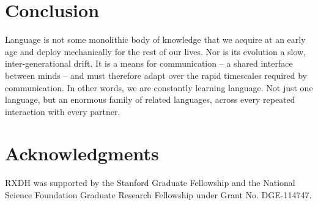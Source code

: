 \documentclass[11pt, floatsintext, jou]{apa6}
\begin{document}

\section{Conclusion}

Language is not some monolithic body of knowledge that we acquire at an early age and deploy mechanically for the rest of our lives. Nor is its evolution a slow, inter-generational drift. It is a means for communication -- a shared interface between minds -- and must therefore adapt over the rapid timescales required by communication. In other words, we are constantly learning language. Not just one language, but an enormous family of related languages, across every repeated interaction with every partner. 


\section{\bf Acknowledgments}
\small
\noindent RXDH was supported by the Stanford Graduate Fellowship and the National Science Foundation Graduate Research Fellowship under Grant No. DGE-114747.

\singlespacing


\end{document}
